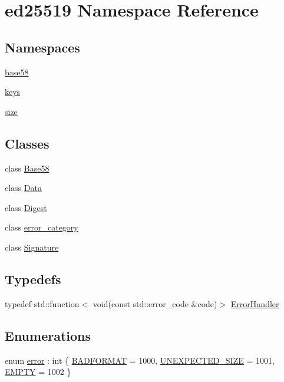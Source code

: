 \hypertarget{namespaceed25519}{}\section{ed25519 Namespace Reference}
\label{namespaceed25519}
\subsection*{Namespaces}
\begin{DoxyCompactItemize}
\item 
 \mbox{\hyperlink{namespaceed25519_1_1base58}{base58}}
\item 
 \mbox{\hyperlink{namespaceed25519_1_1keys}{keys}}
\item 
 \mbox{\hyperlink{namespaceed25519_1_1size}{size}}
\end{DoxyCompactItemize}
\subsection*{Classes}
\begin{DoxyCompactItemize}
\item 
class \mbox{\hyperlink{classed25519_1_1_base58}{Base58}}
\item 
class \mbox{\hyperlink{classed25519_1_1_data}{Data}}
\item 
class \mbox{\hyperlink{classed25519_1_1_digest}{Digest}}
\item 
class \mbox{\hyperlink{classed25519_1_1error__category}{error\+\_\+category}}
\item 
class \mbox{\hyperlink{classed25519_1_1_signature}{Signature}}
\end{DoxyCompactItemize}
\subsection*{Typedefs}
\begin{DoxyCompactItemize}
\item 
typedef std\+::function$<$ void(const std\+::error\+\_\+code \&code)$>$ \mbox{\hyperlink{namespaceed25519_a6ba572942b3c18591fc869d52a6b16e6}{Error\+Handler}}
\end{DoxyCompactItemize}
\subsection*{Enumerations}
\begin{DoxyCompactItemize}
\item 
enum \mbox{\hyperlink{namespaceed25519_ac93d0b5156eaca22197055e902920bc4}{error}} \+: int \{ \mbox{\hyperlink{namespaceed25519_ac93d0b5156eaca22197055e902920bc4a28729b5efcbf8605d4412dbb86c3963b}{B\+A\+D\+F\+O\+R\+M\+AT}} = 1000, 
\mbox{\hyperlink{namespaceed25519_ac93d0b5156eaca22197055e902920bc4a4a6895889f9590d64f64599b968a48b0}{U\+N\+E\+X\+P\+E\+C\+T\+E\+D\+\_\+\+S\+I\+ZE}} = 1001, 
\mbox{\hyperlink{namespaceed25519_ac93d0b5156eaca22197055e902920bc4ad16a8ea865652b7e7222111ab6f7ea36}{E\+M\+P\+TY}} = 1002
 \}
\end{DoxyCompactItemize}
